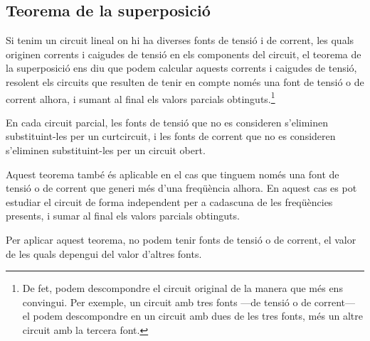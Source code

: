\subsection{Teorema de la superposició}\label{secc:teorema-superpos}

Si tenim un circuit lineal on hi ha diverses fonts de tensió i  de
corrent, les quals originen corrents i caigudes de tensió en els
components del circuit, el teorema de la superposició ens diu que
podem calcular aquests corrents i caigudes de tensió, resolent els
circuits que resulten de tenir en compte  només una font de tensió o
de corrent alhora, i sumant al final els valors parcials
obtinguts.\footnote{De fet, podem descompondre el circuit original de la manera que més ens convingui. Per exemple, un circuit amb tres fonts ---de tensió o de corrent--- el podem descompondre en un circuit amb dues de les tres fonts, més un altre circuit amb la tercera font.}

En cada circuit parcial,  les fonts de tensió que no es consideren s'eliminen substituint-les per un curtcircuit, i les fonts de corrent que no es consideren s'eliminen substituint-les per un  circuit obert.

Aquest teorema també és aplicable en el cas que tinguem només una
font de tensió o de corrent que generi més d'una freqüència alhora. En aquest cas es pot estudiar el circuit de forma
independent per a cadascuna de les freqüències presents, i sumar al final els valors parcials obtinguts.

Per aplicar aquest teorema, no podem tenir fonts de tensió o de corrent, el valor de les quals depengui del valor d'altres fonts.

